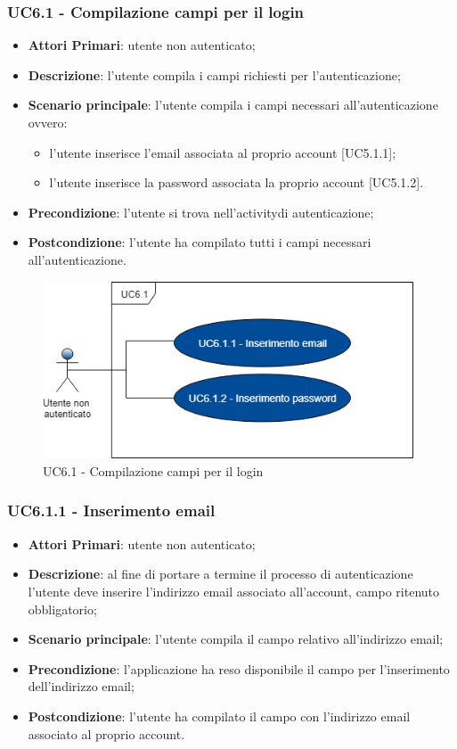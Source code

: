 \subsubsection{UC6.1 - Compilazione campi per il login}
\begin{itemize}
	\item \textbf{Attori Primari}: utente non autenticato;
	\item \textbf{Descrizione}: l'utente compila i campi richiesti per l'autenticazione;
	\item \textbf{Scenario principale}: l'utente compila i campi necessari all'autenticazione ovvero:
		\begin{itemize}
			\item l'utente inserisce l'email associata al proprio account [UC5.1.1];
			\item l'utente inserisce la password associata la proprio account [UC5.1.2].
		\end{itemize}	
	\item \textbf{Precondizione}: l'utente si trova nell'activity\glosp di autenticazione;
	\item \textbf{Postcondizione}: l'utente ha compilato tutti i campi necessari all'autenticazione.	
\end{itemize}
\begin{figure}[h]
	\includegraphics[width=11cm]{res/images/UC6-1Compilazione.png}
	\centering
	\caption{UC6.1 - Compilazione campi per il login}
\end{figure}
\subsubsection{UC6.1.1 - Inserimento email}
\begin{itemize}
	\item \textbf{Attori Primari}: utente non autenticato;
	\item \textbf{Descrizione}: al fine di portare a termine il processo di autenticazione l'utente deve inserire l'indirizzo email associato all'account, campo ritenuto obbligatorio;
	\item \textbf{Scenario principale}: l'utente compila il campo relativo all'indirizzo email;	
	\item \textbf{Precondizione}: l'applicazione ha reso disponibile il campo per l'inserimento dell'indirizzo email;
	\item \textbf{Postcondizione}: l'utente ha compilato il campo con l'indirizzo email associato al proprio account.
\end{itemize}

